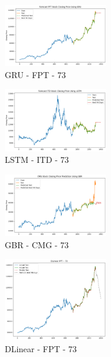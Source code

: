 \documentclass{ieeeojies}
\begin{document}
\begin{figure} [H]
    \centering
    \includegraphics[width=0.4\textwidth]{bibliography/Figure/GRU_FPT_73.png}
    \caption{GRU - FPT - 73}
    \label{fig:GRU_FPT_73}
\end{figure}
\begin{figure} [H]
    \centering
    \includegraphics[width=0.4\textwidth]{bibliography/Figure/LSTM_ITD_73.png}
    \caption{LSTM - ITD - 73}
    \label{fig:LSTM_ITD_73}
\end{figure}
\begin{figure} [H]
    \centering
    \includegraphics[width=0.4\textwidth]{bibliography/Figure/GBR_CMG_73.png}
    \caption{GBR - CMG - 73}
    \label{fig:GBR_CMG_73}
\end{figure}
\begin{figure} [H]
    \centering
    \includegraphics[width=0.4\textwidth]{bibliography/Figure/DLinear_FPT_73.png}
    \caption{DLinear - FPT - 73}
    \label{fig:DLinear_FPT_73}
\end{figure}
\end{document}
